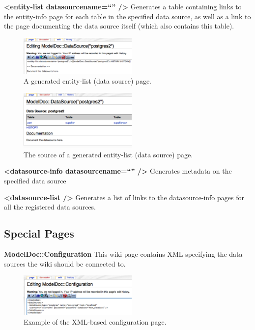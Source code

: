\documentclass{acm_proc_article-sp}
\begin{document}
\textbf{<entity-list datasourcename=``'' />}
Generates a table containing links to the entity-info page for each table in
the specified data source, as well as a link to the page documenting the data
source itself (which also contains this table).

\begin{figure}[ht]
\centering
\includegraphics[width=220px]{entity-list-input.pdf}
\caption{A generated entity-list (data source) page.}
\end{figure}

\begin{figure}[ht]
\centering
\includegraphics[width=220px]{entity-list-output.pdf}
\caption{The source of a generated entity-list (data source) page.}
\end{figure}

\textbf{<datasource-info datasourcename=``'' />}
Generates metadata on the specified data source

\textbf{<datasource-list />}
Generates a list of links to the datasource-info pages for all the registered
data sources.

\subsection{Special Pages}

\textbf{ModelDoc::Configuration}
This wiki-page contains XML specifying the data sources the wiki should be
connected to.

\begin{figure}[ht]
\centering
\includegraphics[width=220px]{configuration.pdf}
\caption{Example of the XML-based configuration page.}
\end{figure}
\end{document}
